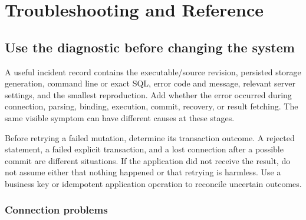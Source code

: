 \chapter{Troubleshooting and Reference}
\label{adv:reference}

\section{Use the diagnostic before changing the system}

A useful incident record contains the executable/source revision, persisted storage generation, command line or exact SQL, error code and message, relevant server settings, and the smallest reproduction. Add whether the error occurred during connection, parsing, binding, execution, commit, recovery, or result fetching. The same visible symptom can have different causes at these stages.

Before retrying a failed mutation, determine its transaction outcome. A rejected statement, a failed explicit transaction, and a lost connection after a possible commit are different situations. If the application did not receive the result, do not assume either that nothing happened or that retrying is harmless. Use a business key or idempotent application operation to reconcile uncertain outcomes.

\subsection{Connection problems}

